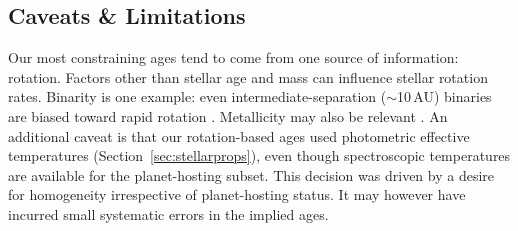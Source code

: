 \documentclass[11pt,twocolumn,tighten]{aastex63}
\begin{document}
%




\subsection{Caveats \& Limitations}

Our most constraining ages tend to come from one source of
information: rotation.  Factors other than stellar age and mass can
influence stellar rotation rates.  Binarity is one example: even
intermediate-separation ($\sim$10\,AU) binaries are biased toward
rapid rotation \citep[e.g.][and many studies thereafter]{Meibom_2007}.
Metallicity may also be relevant
\citep{2020MNRAS.499.3481A,2024arXiv240500779S}.  An additional caveat
is that our rotation-based ages used photometric effective
temperatures (Section~\ref{sec:stellarprops}), even though
spectroscopic temperatures are available for the planet-hosting
subset.  This decision was driven by a desire for homogeneity 
irrespective of planet-hosting status.  It may however have
incurred small systematic errors in the implied ages.
\end{document}
